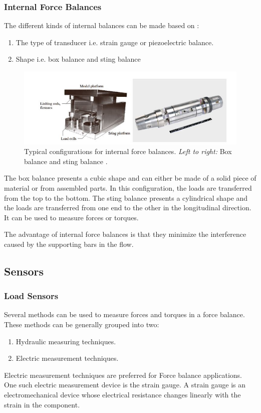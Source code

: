 \subsubsection{Internal Force Balances}
The different kinds of internal balances can be made based on \cite{ferreira2015design}:
\begin{enumerate}
	\item The type of transducer i.e. strain gauge or piezoelectric balance.
	\item Shape i.e. box balance and sting balance
\end{enumerate}
\begin{center}
	\begin{figure}[H]
		\centering
		\includegraphics[width=0.8\linewidth]{Figures/Fig7}
		\caption[Internal force balances]{Typical configurations for internal force balances. \textit{Left to right:} Box balance and sting balance \cite{ferreira2015design}.}
	\end{figure}
\end{center}
The box balance presents a cubic shape and can either be made of a solid piece of material or from assembled parts. In this configuration, the loads are transferred from the top to the bottom. The sting balance presents a cylindrical shape and the loads are transferred from one end to the other in the longitudinal direction. It can be used to measure forces or torques.

The advantage of internal force balances is that they minimize the interference caused by the supporting bars in the flow.
\subsection{Sensors}
\subsubsection{Load Sensors}
Several methods can be used to measure forces and torques in a force balance. These methods can be generally grouped into two\cite{ferreira2015design}:
\begin{enumerate}
	\item Hydraulic measuring techniques.
	\item Electric measurement techniques.
\end{enumerate}
Electric measurement techniques are preferred for Force balance applications. One such electric measurement device is the strain gauge. A strain gauge is an electromechanical device whose electrical resistance changes linearly with the strain in the component.

